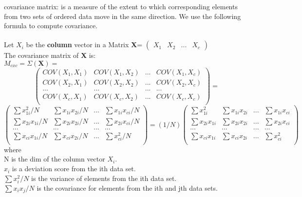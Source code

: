 \begin{compactitem}
\item covariance matrix: is a measure of the extent to which corresponding elements from two sets
of ordered data move in the same direction. We use the following formula to compute covariance.
\cite{wiki-covariance}\cite{STAT-covariance}\\
\\Let $X_i$ be the \textbf{column} vector in a Matrix \textbf{X}=
$\begin{pmatrix} X_1 & X_2 &... & X_c \end{pmatrix}$\\
The covariance matrix of \textbf{X} is:\\
$M_{cxc} = \Sigma{(\textbf{X})}=$
\[
\begin{pmatrix}
       COV(X_1,X_1) 	& COV(X_1,X_2) 	& ...	& COV(X_1,X_c)	\\[0.3em]
       COV(X_2,X_1) 	& COV(X_2,X_2) 	& ...	& COV(X_2,X_c)	\\[0.3em]
       ...		& ...			& ...	&	...		\\[0.3em]
       COV(X_c,X_1) 	& COV(X_c,X_2) 	& ...	& COV(X_c,X_c)	\\[0.3em]
\end{pmatrix}
=\]
\begin{equation}
\label{eq:covarm1}
\begin{pmatrix}
       \sum x_{1i}^{2}/N 	& \sum x_{1i} x_{2i}/N 	& ...	& \sum x_{1i} x_{ci}/N	\\[0.3em]
       \sum x_{2i} x_{1i}/N 	& \sum x_{2i} x_{2i}/N 	& ...	& \sum x_{2i} x_{ci}/N	\\[0.3em]
       ...		& ...			& ...	&	...		\\[0.3em]
       \sum x_{ci} x_{1i}/N 	& \sum x_{ci} x_{2i}/N 	& ...	& \sum x_{ci}^{2}/N	\\[0.3em]
\end{pmatrix}
=(1/N)
\begin{pmatrix}
       \sum x_{1i}^{2} 	& \sum x_{1i} x_{2i} 	& ...	& \sum x_{1i} x_{ci}	\\[0.3em]
       \sum x_{2i} x_{1i} 	& \sum x_{2i} x_{2i} 	& ...	& \sum x_{2i} x_{ci}	\\[0.3em]
       ...		& ...			& ...	&	...		\\[0.3em]
       \sum x_{ci} x_{1i} 	& \sum x_{ci} x_{2i} 	& ...	& \sum x_{ci}^{2}	\\[0.3em]
\end{pmatrix}
\end{equation}
where\\
N is the dim of the column vector $X_i$.\\
$x_i$ is a deviation score from the ith data set.\\
$\sum x_i^2 / N$ is the variance of elements from the ith data set.\\
$\sum x_i x_j / N$ is the covariance for elements from the ith and jth data sets.\\


\end{compactitem}
